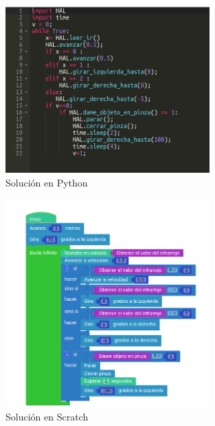 \begin{figure}[H]
    \centering
    \includegraphics[width=0.7\textwidth, height=0.55\textwidth]{chapters/images/solucionppython.png}
    \caption{Solución en Python}
    \label{fig:my_label}
\end{figure}

\begin{figure}[H]
    \centering
    \includegraphics[width=0.7\textwidth, height=0.55\textwidth]{chapters/images/solucionpscratch.png}
    \caption{Solución en Scratch }
    \label{fig:my_label}
\end{figure}